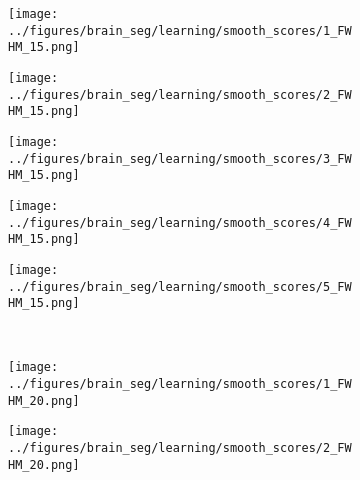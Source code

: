 \begin{figure}[h!]
	\vspace{-0.35cm}
		\begin{subfigure}[b]{0.03\textwidth} %
		\centering
	\end{subfigure}
	\hspace{0.1cm}
	\begin{subfigure}{0.16\textwidth}
		\centering
		\texttt{[image: ../figures/brain\_seg/learning/smooth\_scores/1\_FWHM\_15.png]}
		\label{fig:6}
	\end{subfigure}
	\begin{subfigure}{0.16\textwidth}
		\centering
		\texttt{[image: ../figures/brain\_seg/learning/smooth\_scores/2\_FWHM\_15.png]}
		\label{fig:7}
	\end{subfigure}
	\begin{subfigure}{0.16\textwidth}
		\centering
		\texttt{[image: ../figures/brain\_seg/learning/smooth\_scores/3\_FWHM\_15.png]}
		\label{fig:8}
	\end{subfigure}
	\begin{subfigure}{0.16\textwidth}
		\centering
		\texttt{[image: ../figures/brain\_seg/learning/smooth\_scores/4\_FWHM\_15.png]}
		\label{fig:9}
	\end{subfigure}
	\begin{subfigure}{0.16\textwidth}
		\centering
		\texttt{[image: ../figures/brain\_seg/learning/smooth\_scores/5\_FWHM\_15.png]}
		\label{fig:10}
	\end{subfigure}
	\\
	\vspace{-0.35cm}
		\begin{subfigure}[b]{0.03\textwidth} %
		\centering
	\end{subfigure}
		\hspace{0.1cm}
	\begin{subfigure}{0.16\textwidth}
		\centering
		\texttt{[image: ../figures/brain\_seg/learning/smooth\_scores/1\_FWHM\_20.png]}
		\label{fig:6}
	\end{subfigure}
	\begin{subfigure}{0.16\textwidth}
		\centering
		\texttt{[image: ../figures/brain\_seg/learning/smooth\_scores/2\_FWHM\_20.png]}
		\label{fig:7}
	\end{subfigure}

\end{figure}
